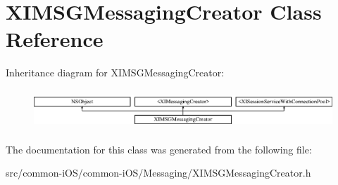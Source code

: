 \hypertarget{interface_x_i_m_s_g_messaging_creator}{}\section{X\+I\+M\+S\+G\+Messaging\+Creator Class Reference}
\label{interface_x_i_m_s_g_messaging_creator}
Inheritance diagram for X\+I\+M\+S\+G\+Messaging\+Creator\+:\begin{figure}[H]
\begin{center}
\leavevmode
\includegraphics[height=1.511471cm]{interface_x_i_m_s_g_messaging_creator}
\end{center}
\end{figure}


The documentation for this class was generated from the following file\+:\begin{DoxyCompactItemize}
\item 
src/common-\/i\+O\+S/common-\/i\+O\+S/\+Messaging/X\+I\+M\+S\+G\+Messaging\+Creator.\+h\end{DoxyCompactItemize}
